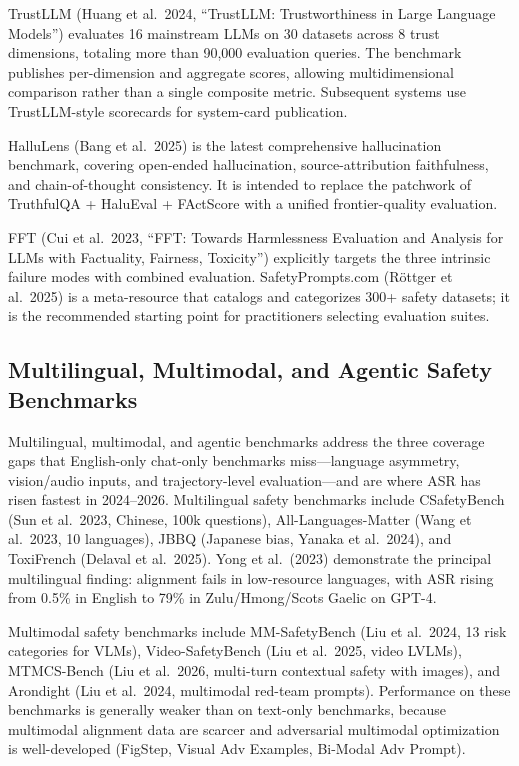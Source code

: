 \documentclass{article}
\begin{document}
TrustLLM (Huang et al.~2024, ``TrustLLM: Trustworthiness in Large Language Models'') evaluates 16 mainstream LLMs on 30 datasets across 8 trust dimensions, totaling more than 90,000 evaluation queries. The benchmark publishes per-dimension and aggregate scores, allowing multidimensional comparison rather than a single composite metric. Subsequent systems use TrustLLM-style scorecards for system-card publication.

HalluLens (Bang et al.~2025) is the latest comprehensive hallucination benchmark, covering open-ended hallucination, source-attribution faithfulness, and chain-of-thought consistency. It is intended to replace the patchwork of TruthfulQA + HaluEval + FActScore with a unified frontier-quality evaluation.

FFT (Cui et al.~2023, ``FFT: Towards Harmlessness Evaluation and Analysis for LLMs with Factuality, Fairness, Toxicity'') explicitly targets the three intrinsic failure modes with combined evaluation. SafetyPrompts.com (Röttger et al.~2025) is a meta-resource that catalogs and categorizes 300+ safety datasets; it is the recommended starting point for practitioners selecting evaluation suites.

\subsection{Multilingual, Multimodal, and Agentic Safety Benchmarks}\label{multilingual-multimodal-and-agentic-safety-benchmarks}

Multilingual, multimodal, and agentic benchmarks address the three coverage gaps that English-only chat-only benchmarks miss---language asymmetry, vision/audio inputs, and trajectory-level evaluation---and are where ASR has risen fastest in 2024--2026. Multilingual safety benchmarks include CSafetyBench (Sun et al.~2023, Chinese, 100k questions), All-Languages-Matter (Wang et al.~2023, 10 languages), JBBQ (Japanese bias, Yanaka et al.~2024), and ToxiFrench (Delaval et al.~2025). Yong et al.~(2023) demonstrate the principal multilingual finding: alignment fails in low-resource languages, with ASR rising from 0.5\% in English to 79\% in Zulu/Hmong/Scots Gaelic on GPT-4.

Multimodal safety benchmarks include MM-SafetyBench (Liu et al.~2024, 13 risk categories for VLMs), Video-SafetyBench (Liu et al.~2025, video LVLMs), MTMCS-Bench (Liu et al.~2026, multi-turn contextual safety with images), and Arondight (Liu et al.~2024, multimodal red-team prompts). Performance on these benchmarks is generally weaker than on text-only benchmarks, because multimodal alignment data are scarcer and adversarial multimodal optimization is well-developed (FigStep, Visual Adv Examples, Bi-Modal Adv Prompt).
\end{document}

